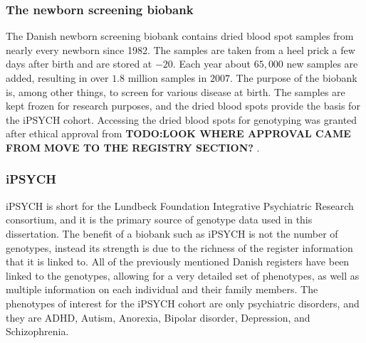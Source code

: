 \subsubsection{The newborn screening biobank}
The Danish newborn screening biobank contains dried blood spot samples from nearly every newborn since 1982. The samples are taken from a heel prick a few days after birth and are stored at $ -20 $\textcelsius. Each year about $ 65,000 $ new samples are added, resulting in over $ 1.8 $ million samples in $ 2007 $. The purpose of the biobank is, among other things, to screen for various disease at birth. The samples are kept frozen for research purposes, and the dried blood spots provide the basis for the iPSYCH cohort. Accessing the dried blood spots for genotyping was granted after ethical approval from \textbf{TODO:LOOK WHERE APPROVAL CAME FROM} \textbf{MOVE TO THE REGISTRY SECTION?}  \cite{norgaard2007storage}.

\subsubsection{iPSYCH}
iPSYCH is short for the Lundbeck Foundation Integrative Psychiatric Research consortium, and it is the primary source of genotype data used in this dissertation. The benefit of a biobank such as iPSYCH is not the number of genotypes, instead its strength is due to the richness of the register information that it is linked to. All of the previously mentioned Danish registers have been linked to the genotypes, allowing for a very detailed set of phenotypes, as well as multiple information on each individual and their family members. The phenotypes of interest for the iPSYCH cohort are only psychiatric disorders, and they are ADHD, Autism, Anorexia, Bipolar disorder, Depression, and Schizophrenia\cite{pedersen2018ipsych2012}.

